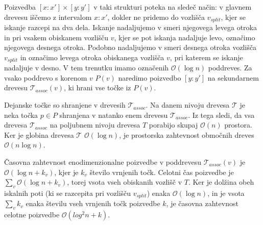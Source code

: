 \documentclass[a4paper, 12pt]{book}
\newcommand{\T}{\ensuremath{\mathcal{T}}}
\newcommand{\OO}{\ensuremath{\mathcal{O}}} %
\begin{document}
Poizvedba $[x:x'] \times [y:y']$ v taki strukturi poteka na sledeč način: v glavnem drevesu iščemo z intervalom $x:x'$, dokler ne pridemo do vozlišča $v_{split}$, kjer se iskanje razcepi na dva dela. Iskanje nadaljujemo v smeri njegovega levega otroka in pri vsakem obiskanem vozlišču $v$, kjer se pot iskanja nadaljuje levo, označimo njegovega desnega otroka. Podobno nadaljujemo v smeri desnega otroka vozlišča $v_{split}$ in označimo levega otroka obiskanega vozlišča $v$, pri katerem se iskanje nadaljuje v desno. 
V tem trenutku imamo označenih $\OO(\log n)$ poddreves. Za vsako poddrevo s korenom $v$ $P(v)$ naredimo poizvedbo $[y:y']$ na sekundarnem drevesu $\T_{assoc}(v)$, ki hrani vse točke iz $P(v)$. 

Dejanske točke so shranjene v drevesih $\T_{assoc}$. Na danem nivoju drevesa $\T$ je neka točka $p \in P$ shranjena v natanko enem drevesu $\T_{assoc}$. Iz tega sledi, da vsa drevesa $\T_{assoc}$ na poljubnem nivoju drevesa $T$ porabijo skupaj $\OO(n)$ prostora. Ker je globina drevesa $\T$ $\OO(\log n)$, je prostorska zahtevnost območnih dreves $\OO(n\log n)$.

Časovna zahtevnost enodimenzionalne poizvedbe v poddrevesu $\T_{assoc}(v)$ je $\OO(\log n + k_v)$, kjer je $k_v$ število vrnjenih točk. Celotni čas poizvedbe je $\sum_v\OO(\log n + k_v)$, torej vsota vseh obiskanih vozlišč v $T$. Ker je dolžina obeh iskalnih poti (ki se razcepita pri vozlišču $v_{split}$) enaka $\OO(\log n)$, in je vsota $\sum_v k_v$ enaka številu vseh vrnjenih točk poizvedbe $k$, je časovna zahtevnost celotne poizvedbe $\OO(log^2n + k)$.
\end{document}
